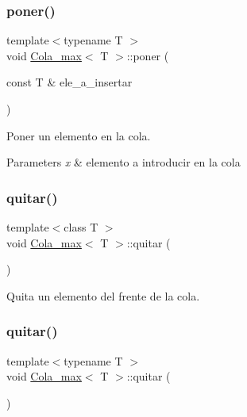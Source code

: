 \subsubsection{\texorpdfstring{poner()}{poner()}\hspace{0.1cm}{\footnotesize\ttfamily [2/2]}}
{\footnotesize\ttfamily template$<$typename T $>$ \\
void \mbox{\hyperlink{class_cola__max}{Cola\+\_\+max}}$<$ T $>$\+::poner (\begin{DoxyParamCaption}\item[{const T \&}]{ele\+\_\+a\+\_\+insertar }\end{DoxyParamCaption})}



Poner un elemento en la cola. 


\begin{DoxyParams}{Parameters}
{\em x} & elemento a introducir en la cola \\
\hline
\end{DoxyParams}
\mbox{\label{class_cola__max_a21f1d915c674522d438f8288177e7ecb}} 
\subsubsection{\texorpdfstring{quitar()}{quitar()}\hspace{0.1cm}{\footnotesize\ttfamily [1/2]}}
{\footnotesize\ttfamily template$<$class T $>$ \\
void \mbox{\hyperlink{class_cola__max}{Cola\+\_\+max}}$<$ T $>$\+::quitar (\begin{DoxyParamCaption}{ }\end{DoxyParamCaption})}



Quita un elemento del frente de la cola. 

\mbox{\label{class_cola__max_a21f1d915c674522d438f8288177e7ecb}} 
\subsubsection{\texorpdfstring{quitar()}{quitar()}\hspace{0.1cm}{\footnotesize\ttfamily [2/2]}}
{\footnotesize\ttfamily template$<$typename T $>$ \\
void \mbox{\hyperlink{class_cola__max}{Cola\+\_\+max}}$<$ T $>$\+::quitar (\begin{DoxyParamCaption}{ }\end{DoxyParamCaption})}



